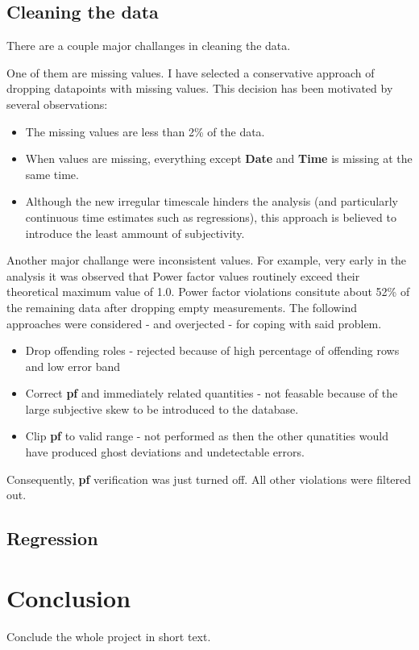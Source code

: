 \documentclass[11pt]{article}
\newcommand{\code}[1]{\textbf{#1}}
\newcommand{\para}[0]{\par\vspace{0.5cm}}
\begin{document}
\subsection{Cleaning the data}
There are a couple major challanges in cleaning the data.
\para
One of them are missing values.
I have selected a conservative approach of dropping datapoints with missing values.
This decision has been motivated by several observations:
\begin{itemize}
    \item{The missing values are less than 2\% of the data.}
    \item{When values are missing, everything except \code{Date} and \code{Time} is missing at the same time.}
    \item{Although the new irregular timescale hinders the analysis (and particularly continuous time estimates such as regressions), this approach is believed to introduce the least ammount of subjectivity.}
\end{itemize}
\para
Another major challange were inconsistent values.
For example, very early in the analysis it was observed that Power factor values routinely exceed their theoretical maximum value of 1.0.
Power factor violations consitute about 52\% of the remaining data after dropping empty measurements.
The followind approaches were considered - and overjected - for coping with said problem.
\begin{itemize}
    \item{Drop offending roles - rejected because of high percentage of offending rows and low error band}
    \item{Correct \code{pf} and immediately related quantities - not feasable because of the large subjective skew to be introduced to the database.}
    \item{Clip \code{pf} to valid range - not performed as then the other qunatities would have produced ghost deviations and undetectable errors.}
\end{itemize}
Consequently, \code{pf} verification was just turned off.
All other violations were filtered out.


\subsection{Regression}
\section{Conclusion}
Conclude the whole project in short text.


 
\end{document}
